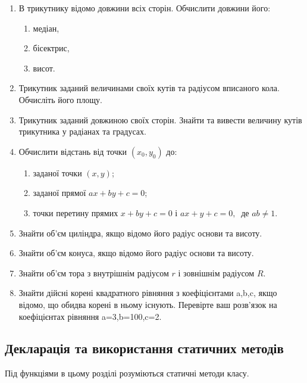 \documentclass[]{article}
\makeatletter
\newcommand{\xslalph}[1]{\expandafter\@xslalph\csname c@#1\endcsname}
\newcommand{\@xslalph}[1]{%
    \ifcase#1\or а\or б\or в\or г\or д\or e\or є\or ж\or з\or i%
    \or й\or к\or л\or м\or н\or о\or п\or р\or с\or т%
    \or у\or ф\or х\or ц\or ч\or ш\or ю\or я\or аа\or бб\or вв %
    \else\@ctrerr\fi%
}
\makeatother
\begin{document}
\begin{enumerate}
\item
  В трикутнику відомо довжини всіх сторін. Обчислити довжини його:
  \begin{enumerate}[label=\xslalph*)]
   \item
    медіан,
   \item
    бісектрис,
    \item
    висот.
  \end{enumerate}
\item
Трикутник заданий величинами своїх кутів та радіусом вписаного кола.
Обчисліть його площу.
\item
Трикутник заданий довжиною своїх сторін. Знайти та вивести величину
кутів трикутника у радіанах та градусах.
\item
 Обчислити відстань від точки \((x_{0},y_{0})\) до:
\begin{enumerate}[label=\xslalph*)]
\item заданої точки \((x,y)\);
\item заданої прямої \(ax + by + c = 0\);
\item точки перетину прямих \(x + by + c = 0\) і
\(ax + y + c = 0,\ \) де 
\(ab \neq 1\).
\end{enumerate}
\item
Знайти об'єм циліндра, якщо відомо його радіус основи та висоту.
\item
Знайти об'єм конуса, якщо відомо його радіус основи та висоту.
\item
Знайти об'єм тора з внутрішнім радіусом $r$ і зовнішнім радіусом $R$.
\item
Знайти дійсні корені квадратного рівняння з коефіцієнтами a,b,c, якщо відомо,
що обидва корені в ньому існують. Перевірте ваш розв'язок на
коефіцієнтах рівняння a=3,b=100,c=2.
\end{enumerate}

\subsection{Декларація та використання статичних методів}

Під функціями в цьому розділі розуміються статичні методи класу.
\end{document}
